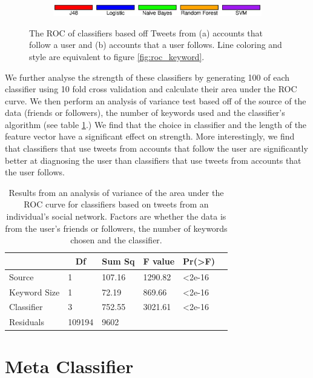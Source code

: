 \documentclass{acm_proc_article-sp}
\begin{document}
\begin{figure} [h]
\begin{subfigure}[b]{.2\textwidth}
\end{subfigure}
\begin{subfigure}[b]{.45\textwidth}
\includegraphics[width=\textwidth]{figs/keyword_legend.eps}
\end{subfigure}
\caption{The ROC of classifiers based off Tweets from (a) accounts that follow a user and (b) accounts that a user follows. Line coloring and style are equivalent to figure \ref{fig:roc_keyword}.}
\label{fig:roc_network}
\end{figure}

We further analyse the strength of these classifiers by generating 100 of each classifier using 10 fold cross validation and calculate their area under the ROC curve. We then perform an analysis of variance test based off of the source of the data (friends or followers), the number of keywords used and the classifier's algorithm (see table \ref{tab:network_aov}.) We find that the choice in classifier and the length of the feature vector have a significant effect on strength. More interestingly, we find that classifiers that use tweets from accounts that follow the user are significantly better at diagnosing the user than classifiers that use tweets from accounts that the user follows. 

\begin{table}
\begin{center}
\begin{tabular}{llllll}
\hline\hline
\multicolumn{1}{c}{ }&\multicolumn{1}{c}{Df}&\multicolumn{1}{c}{Sum Sq}&\multicolumn{1}{c}{F value}&\multicolumn{1}{c}{Pr(\textgreater F)}\tabularnewline
\hline
Source&1&107.16&1290.82&\textless 2e-16 \tabularnewline
Keyword Size&1&72.19&869.66&\textless 2e-16\tabularnewline
Classifier&3&752.55&3021.61&\textless 2e-16\tabularnewline
Residuals&109194&9602& & \tabularnewline
\hline
\end{tabular}
\end{center}
\caption{Results from an analysis of variance of the area under the ROC curve for classifiers based on tweets from an individual's social network. Factors are whether the data is from the user's friends or followers, the number of keywords chosen and the classifier. }
\label{tab:network_aov}
\end{table}

\section{Meta Classifier}
\end{document}
